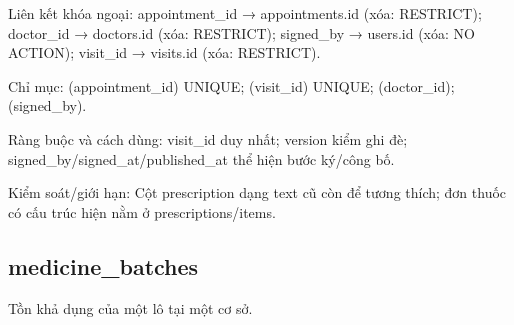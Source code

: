 Liên kết khóa ngoại:\allowbreak{} appointment\_\allowbreak{}id → appointments.\allowbreak{}id (xóa:\allowbreak{} RESTRICT); doctor\_\allowbreak{}id → doctors.\allowbreak{}id (xóa:\allowbreak{} RESTRICT); signed\_\allowbreak{}by → users.\allowbreak{}id (xóa:\allowbreak{} NO ACTION); visit\_\allowbreak{}id → visits.\allowbreak{}id (xóa:\allowbreak{} RESTRICT).\allowbreak{}

Chỉ mục:\allowbreak{} (appointment\_\allowbreak{}id) UNIQUE; (visit\_\allowbreak{}id) UNIQUE; (doctor\_\allowbreak{}id); (signed\_\allowbreak{}by).\allowbreak{}

Ràng buộc và cách dùng:\allowbreak{} visit\_\allowbreak{}id duy nhất; version kiểm ghi đè; signed\_\allowbreak{}by/\allowbreak{}signed\_\allowbreak{}at/\allowbreak{}published\_\allowbreak{}at thể hiện bước ký/\allowbreak{}công bố.\allowbreak{}

Kiểm soát/\allowbreak{}giới hạn:\allowbreak{} Cột prescription dạng text cũ còn để tương thích; đơn thuốc có cấu trúc hiện nằm ở prescriptions/\allowbreak{}items.\allowbreak{}

\clearpage

\subsection{medicine\_\allowbreak{}batches}
Tồn khả dụng của một lô tại một cơ sở.\allowbreak{}


